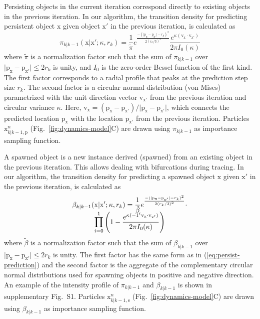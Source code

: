Persisting objects in the current iteration correspond directly to existing objects in the previous iteration. In our algorithm, the transition density for predicting persistent object $\mathrm{x}$ given object $\mathrm{x'}$ in the previous iteration, is calculated as
\begin{equation}
\label{eq:persist-prediction}
\pi_{k|k-1}(\mathrm{x}|\mathrm{x'}; \kappa, r_k) = \frac{1}{\tilde{\pi}} e^{\frac{-(\vert \mathrm{p}_{\mathrm{x}} - \mathrm{p}_{\mathrm{x'}}  \vert - r_k)^2  }{2 (r_k/3)^2}} \frac{e^{\kappa (\mathrm{v}_{\mathrm{x}} \cdot \mathrm{v}_{\mathrm{x'}})}}{2 \pi I_0(\kappa)}
\end{equation}
where $\tilde{\pi}$ is a normalization factor such that the sum of $\pi_{k|k-1}$ over $\vert \mathrm{p}_{\mathrm{x}} - \mathrm{p}_{\mathrm{x'}} \vert \leq 2r_k$ is unity, and $I_0$ is the zero-order Bessel function of the first kind. The first factor corresponds to a radial profile that peaks at the prediction step size $r_k$. The second factor is a circular normal distribution (von Mises) parametrized with the unit direction vector $\mathrm{v}_{\mathrm{x'}}$ from the previous iteration and circular variance $\kappa$. Here, $\mathrm{v}_{\mathrm{x}} = (\mathrm{p}_{\mathrm{x}} - \mathrm{p}_{\mathrm{x'}})/\vert \mathrm{p}_{\mathrm{x}} - \mathrm{p}_{\mathrm{x'}} \vert$, which connects the predicted location $\mathrm{p}_{\mathrm{x}}$ with the location $\mathrm{p}_{\mathrm{x'}}$ from the previous iteration. Particles $\mathrm{x}_{k|k-1,\mathrm{p}}^{n}$ (Fig.~\ref{fig:dynamics-model}C) are drawn using $\pi_{k|k-1}$ as importance sampling function.

A spawned object is a new instance derived (spawned) from an existing object in the previous iteration. This allows dealing with bifurcations during tracing. In our algorithm, the transition density for predicting a spawned object $\mathrm{x}$ given $\mathrm{x'}$ in the previous iteration, is calculated as
\begin{multline}
\label{eq:spawn-prediction}
\beta_{k|k-1}(\mathrm{x}|\mathrm{x'}; \kappa, r_k) = \frac{1}{\tilde{\beta}} e^{\frac{-(\vert \mathrm{p}_{\mathrm{x}} - \mathrm{p}_{\mathrm{x'}} \vert-r_k)^2}{2(r_k/3)^2}} \cdot \\[-0.5\baselineskip]
\prod\limits_{i=0}^{1} \left( 1 - \frac{e^{\kappa (-1^i \mathrm{v}_{\mathrm{x}} \cdot \mathrm{v}_{\mathrm{x'}})}}{2 \pi I_0(\kappa)} \right)
\end{multline}
where $\tilde{\beta}$ is a normalization factor such that the sum of $\beta_{k|k-1}$ over $\vert \mathrm{p}_{\mathrm{x}} - \mathrm{p}_{\mathrm{x'}} \vert \leq 2r_k$ is unity. The first factor has the same form as in (\ref{eq:persist-prediction}) and the second factor is the aggregate of the complementary circular normal distributions used for spawning objects in positive and negative direction. An example of the intensity profile of $\pi_{k|k-1}$ and $\beta_{k|k-1}$ is shown in supplementary Fig.~S1. Particles $\mathrm{x}_{k|k-1,\mathrm{s}}^{n}$ (Fig.~\ref{fig:dynamics-model}C) are drawn using $\beta_{k|k-1}$ as importance sampling function.

